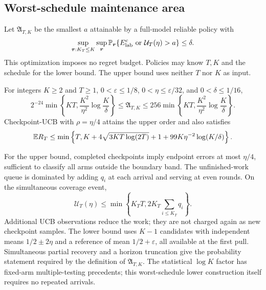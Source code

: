 \documentclass[11pt]{article}
\begin{document}
\subsection{Worst-schedule maintenance area}

Let $\mathfrak A_{T,K}$ be the smallest $a$ attainable by a full-model reliable
policy with
\[
 \sup_{\boldsymbol\tau:K_T\le K}\sup_{\boldsymbol r}
 \mathbb P_{\boldsymbol r}\{E_{\rm lab}^c\ \text{or}\ \mathcal U_T(\eta)>a\}\le\delta.
\]
This optimization imposes no regret budget. Policies may know $T,K$ and the
schedule for the lower bound. The upper bound uses neither $T$ nor $K$ as
input.

\begin{theorem}
\label{thm:worst_area}
For integers $K\ge2$ and $T\ge1$, $0<\varepsilon\le1/8$,
$0<\eta\le\varepsilon/32$, and $0<\delta\le1/16$,
\begin{equation}
 2^{-24}\min\left\{KT,\frac{K^2}{\eta^2}\log\frac K\delta\right\}
 \le\mathfrak A_{T,K}\le
 256\min\left\{KT,\frac{K^2}{\eta^2}\log\frac K\delta\right\}.
 \label{eq:worst_area}
\end{equation}
Checkpoint-UCB with $\rho=\eta/4$ attains the upper order and also satisfies
\begin{equation}
 \mathbb E R_T\le\min\left\{T,K+4\sqrt{3KT\log(2T)}+1+
                         99K\eta^{-2}\log(K/\delta)\right\}.
 \label{eq:joint_general}
\end{equation}
\end{theorem}

For the upper bound, completed checkpoints imply endpoint errors at most
$\eta/4$, sufficient to classify all arms outside the boundary band. The
unfinished-work queue is dominated by adding $q_i$ at each arrival and serving
at even rounds. On the simultaneous coverage event,
\begin{equation}
 \mathcal U_T(\eta)\le\min\left\{K_TT,
                         2K_T\sum_{i\le K_T}q_i\right\}.
 \label{eq:queue_upper}
\end{equation}
Additional UCB observations reduce the work; they are not charged again as
new checkpoint samples. The lower bound uses $K-1$ candidates with independent
means $1/2\pm2\eta$ and a reference of mean $1/2+\varepsilon$, all available
at the first pull. Simultaneous partial recovery and a horizon truncation give
the probability statement required by the definition of $\mathfrak A_{T,K}$.
The statistical $\log K$ factor has fixed-arm multiple-testing precedents;
this worst-schedule lower construction itself requires no repeated arrivals.
\end{document}
